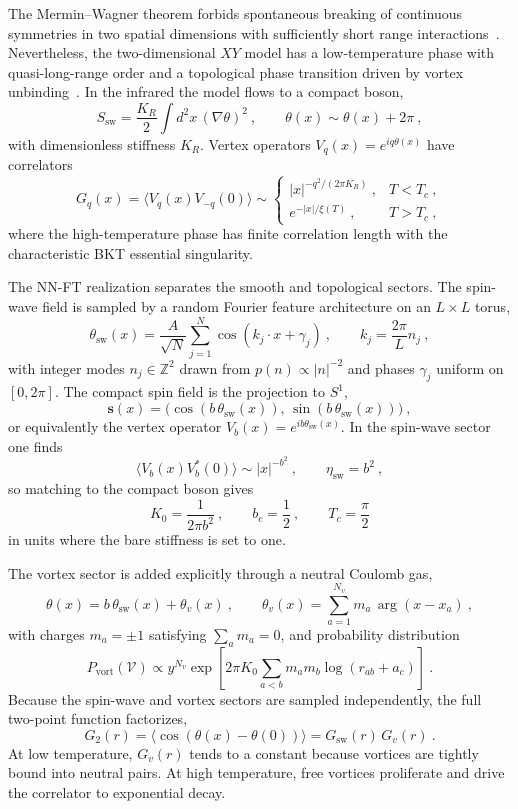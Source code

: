 \documentclass[11pt,a4paper]{article}
\newcommand\be{\begin{equation}}
\newcommand\ee{\end{equation}}
\begin{document}
The Mermin--Wagner theorem forbids spontaneous breaking of continuous symmetries in two spatial dimensions with sufficiently short range interactions~\cite{MerminWagner1966}. Nevertheless, the two-dimensional $XY$ model has a low-temperature phase with quasi-long-range order and a topological phase transition driven by vortex unbinding~\cite{Berezinskii1971,KosterlitzThouless1973,Kosterlitz1974,NelsonKosterlitz1977}. In the infrared the model flows to a compact boson,
\be
S_\text{sw}=\frac{K_R}{2}\int d^2x\,(\nabla\theta)^2~,
\qquad \theta(x)\sim\theta(x)+2\pi~,
\label{eq:swaction}
\ee
with dimensionless stiffness $K_R$. Vertex operators $V_q(x)=e^{iq\theta(x)}$ have correlators
\be
G_q(x)=\langle V_q(x)V_{-q}(0)\rangle
\sim
\begin{cases}
|x|^{-q^2/(2\pi K_R)}~, & T<T_c~,\\[3pt]
e^{-|x|/\xi(T)}~, & T>T_c~,
\end{cases}
\label{eq:bktcorr}
\ee
where the high-temperature phase has finite correlation length with the characteristic BKT essential singularity.

The NN-FT realization separates the smooth and topological sectors. The spin-wave field is sampled by a random Fourier feature architecture on an $L\times L$ torus,
\be
\theta_\text{sw}(x)=\frac{A}{\sqrt N}\sum_{j=1}^N \cos(k_j\!\cdot\!x+\gamma_j)~,
\qquad k_j=\frac{2\pi}{L}n_j~, 
\label{eq:thetann}
\ee
with integer modes $n_j\in\mathbb Z^2$ drawn from $p(n)\propto |n|^{-2}$ and phases $\gamma_j$ uniform on $[0,2\pi]$. The compact spin field is the projection to $S^1$,
\be
\bm s(x)=\big(\cos(b\,\theta_\text{sw}(x)),\,\sin(b\,\theta_\text{sw}(x))\big)~,
\label{eq:spinfield}
\ee
or equivalently the vertex operator $V_b(x)=e^{ib\theta_\text{sw}(x)}$. In the spin-wave sector one finds
\be
\langle V_b(x)V_b^*(0)\rangle\sim |x|^{-b^2}~,
\qquad \eta_\text{sw}=b^2~,
\label{eq:eta}
\ee
so matching to the compact boson gives
\be
K_0=\frac{1}{2\pi b^2}~,
\qquad b_c=\frac12~,
\qquad T_c=\frac{\pi}{2}
\label{eq:dictionary}
\ee
in units where the bare stiffness is set to one.

The vortex sector is added explicitly through a neutral Coulomb gas,
\be
\theta(x)=b\,\theta_\text{sw}(x)+\theta_v(x)~,
\qquad
\theta_v(x)=\sum_{a=1}^{N_v}m_a\,\arg(x-x_a)~,
\label{eq:vortexfield}
\ee
with charges $m_a=\pm 1$ satisfying $\sum_a m_a=0$, and probability distribution
\be
P_\text{vort}(\mathcal V)\propto y^{N_v}
\exp\!\left[2\pi K_0\sum_{a<b}m_am_b\log(r_{ab}+a_c)\right]~.
\label{eq:cvort}
\ee
Because the spin-wave and vortex sectors are sampled independently, the full two-point function factorizes,
\be
G_2(r)=\langle\cos(\theta(x)-\theta(0))\rangle=G_\text{sw}(r)\,G_v(r)~.
\label{eq:factor}
\ee
At low temperature, $G_v(r)$ tends to a constant because vortices are tightly bound into neutral pairs. At high temperature, free vortices proliferate and drive the correlator to exponential decay.
\end{document}
